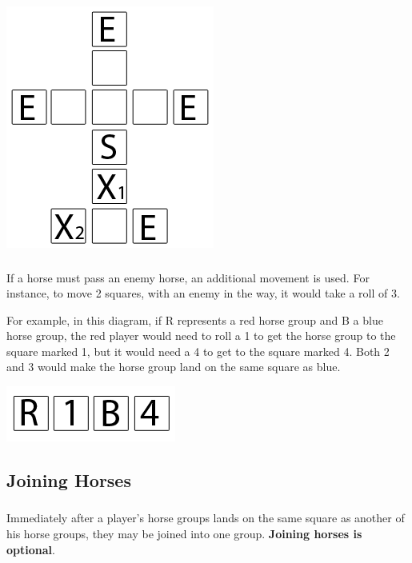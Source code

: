 \documentclass[12pt]{article} %
\begin{document}
\centerline{\includegraphics[scale=.75]{notnyoutdiagram1.png}}

\subsubsection{}
If a horse must pass an enemy horse, an additional movement is used.  For instance, to move 2 squares, with an enemy in the way, it would take a roll of 3.\newline

For example, in this diagram, if R represents a red horse group and B a blue horse group, the red player would need to roll a 1 to get the horse group to the square marked 1, but it would need a 4 to get to the square marked 4.  Both 2 and 3 would make the horse group land on the same square as blue.\newline

\centerline{\includegraphics[scale=1]{notnyoutdiagram2.png}}

\subsection{Joining Horses}

\subsubsection{}
Immediately after a player's horse groups lands on the same square as another of his horse groups, they may be joined into one group.  \textbf{Joining horses is optional}. 
\end{document}

